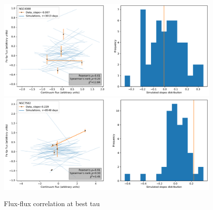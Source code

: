 \begin{figure}
\begin{center}
    {
  \includegraphics[width=\textwidth]{Figs/Chapter5/Flux_corr/Flux_flux_NGC4388_besttau.pdf} \\
  \includegraphics[width=\textwidth]{Figs/Chapter5/Flux_corr/Flux_flux_NGC7582_besttau.pdf} \\
  \caption{Flux-flux correlation at best tau}
    \label{fig:Flux-flux_all_5}
  }
\end{center}
\end{figure}

